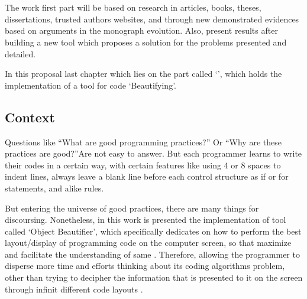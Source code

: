 

%


\chapter{}

The work first part will be based on research in
articles, books, theses, dissertations, trusted authors websites,
and through new demonstrated evidences based on arguments
in the monograph evolution.
Also, present results after building a new tool
which proposes a solution for the problems presented and detailed.

In this proposal last chapter which lies on the part
called `', which holds the implementation of a
tool for code `Beautifying'.



\section{Context}

Questions like ``What are good programming practices?'' Or ``Why are these
practices are good?''Are not easy to answer. But each programmer learns to
write their codes in a certain way, with certain features like using 4 or 8
spaces to indent lines, always leave a blank line before each control
structure as if or for statements, and alike rules.
\cite{naturalCodingConventions}

But entering the universe of good practices, there are many things for
discoursing. Nonetheless, in this work is presented the implementation of
tool called `Object Beautifier', which specifically dedicates on how to
perform the best layout/display of programming code on the computer screen,
so that maximize and facilitate the understanding of same
\cite{automaticSynthesis}.
Therefore, allowing the programmer to disperse
more time and efforts thinking about its coding algorithms problem,
other than trying to decipher the information that is presented
to it on the screen through infinit different code layouts
\cite{usingVersionControlData}.

